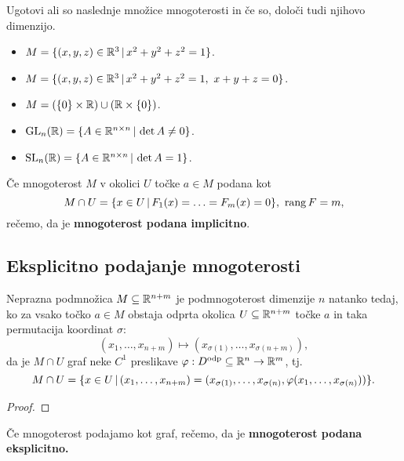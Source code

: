 \begin{zgled}
    Ugotovi ali so naslednje množice mnogoterosti in če so, določi tudi njihovo dimenzijo.
    \begin{itemize}
        \item $M = \{(x,y,z) \in \mathbb{R}^3 \,|\, x^2+y^2+z^2 = 1\}$.
        \item $M = \{(x,y,z) \in \mathbb{R}^3 \,|\, x^2+y^2+z^2 = 1, \ x+y+z = 0\}$.
        \item $M = (\{0\} \times \mathbb{R}) \cup (\mathbb{R} \times \{0\})$.
        \item $\operatorname{GL}_n(\mathbb{R}) = \{A \in \mathbb{R}^{n \times n} \,|\, \det A \neq 0\}$.
        \item $\operatorname{SL}_n(\mathbb{R}) = \{A \in \mathbb{R}^{n \times n} \,|\, \det A = 1\}$.
    \end{itemize}
\end{zgled}

\begin{definicija}
    Če mnogoterost \(M\) v okolici \(U\) točke \(a \in M\) podana kot 
    $$M \cap U = \{x \in U \,|\, F_1(x) = \ldots = F_m(x) = 0\},\ \operatorname{rang} F = m,$$ rečemo, da je \textbf{mnogoterost podana implicitno}.
\end{definicija}

\subsection{Eksplicitno podajanje mnogoterosti}

\begin{trditev}
    Neprazna podmnožica \(M \subseteq \mathbb{R}^{n+m}\) je podmnogoterost dimenzije \(n\) natanko tedaj, ko za vsako točko \(a \in M\) obstaja odprta okolica \(U \subseteq \mathbb{R}^{n+m}\) točke \(a\) in taka permutacija koordinat \(\sigma\):
    \[
        (x_1, \ldots, x_{n+m}) \mapsto (x_{\sigma(1)}, \ldots, x_{\sigma(n+m)}),
    \] 
    da je \(M \cap U\) graf neke \(C^1\) preslikave \(\varphi: D^\text{odp} \subseteq \mathbb{R}^n \to \mathbb{R}^m\), tj.\ 
    \[
        M \cap U = \{x \in U \,|\, (x_1, \ldots, x_{n+m}) = (x_{\sigma(1)}, \ldots, x_{\sigma(n)}, \varphi(x_1, \ldots, x_{\sigma(n)}))\}.
    \]
\end{trditev}

\begin{proof}
    \todo{}
\end{proof}

\begin{definicija}
    Če mnogoterost podajamo kot graf, rečemo, da je \textbf{mnogoterost podana eksplicitno.}
\end{definicija}

